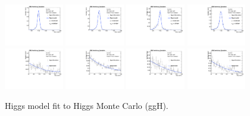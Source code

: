 \begin{figure}[thb]
  \centering
\includegraphics[width=0.23\textwidth]{figures/sec-signals/HiggsShapes/ggh_HM_signal_fit_mgg_cat0.pdf}
\includegraphics[width=0.23\textwidth]{figures/sec-signals/HiggsShapes/ggh_HM_signal_fit_mgg_cat1.pdf}
\includegraphics[width=0.23\textwidth]{figures/sec-signals/HiggsShapes/ggh_LM_signal_fit_mgg_cat0.pdf}
\includegraphics[width=0.23\textwidth]{figures/sec-signals/HiggsShapes/ggh_LM_signal_fit_mgg_cat1.pdf}
\includegraphics[width=0.23\textwidth]{figures/sec-signals/HiggsShapes/ggh_HM_signal_fit_mjj_cat0.pdf}
\includegraphics[width=0.23\textwidth]{figures/sec-signals/HiggsShapes/ggh_HM_signal_fit_mjj_cat1.pdf}
\includegraphics[width=0.23\textwidth]{figures/sec-signals/HiggsShapes/ggh_LM_signal_fit_mjj_cat0.pdf}
\includegraphics[width=0.23\textwidth]{figures/sec-signals/HiggsShapes/ggh_LM_signal_fit_mjj_cat1.pdf}
  \caption{Higgs model fit to Higgs Monte Carlo (ggH).}
  \label{fig:higgs_fit_ggh}
\end{figure}

